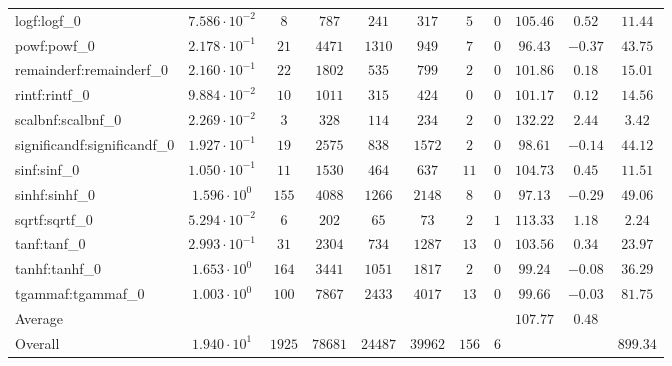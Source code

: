 \begin{tabular}{|l|c|c|c|c|c|c|c|c|c|c|}
logf:logf\_0                 & $ 7.586 \cdot 10^{-2} $ & $ 8      $ & $ 787   $ & $ 241   $ & $ 317   $ & $ 5   $ & $ 0 $ & $ 105.46      $ & $ 0.52    $ & $ 11.44   $ \\
powf:powf\_0                 & $ 2.178 \cdot 10^{-1} $ & $ 21     $ & $ 4471  $ & $ 1310  $ & $ 949   $ & $ 7   $ & $ 0 $ & $ 96.43       $ & $ -0.37   $ & $ 43.75   $ \\
remainderf:remainderf\_0     & $ 2.160 \cdot 10^{-1} $ & $ 22     $ & $ 1802  $ & $ 535   $ & $ 799   $ & $ 2   $ & $ 0 $ & $ 101.86      $ & $ 0.18    $ & $ 15.01   $ \\
rintf:rintf\_0               & $ 9.884 \cdot 10^{-2} $ & $ 10     $ & $ 1011  $ & $ 315   $ & $ 424   $ & $ 0   $ & $ 0 $ & $ 101.17      $ & $ 0.12    $ & $ 14.56   $ \\
scalbnf:scalbnf\_0           & $ 2.269 \cdot 10^{-2} $ & $ 3      $ & $ 328   $ & $ 114   $ & $ 234   $ & $ 2   $ & $ 0 $ & $ 132.22      $ & $ 2.44    $ & $ 3.42    $ \\
significandf:significandf\_0 & $ 1.927 \cdot 10^{-1} $ & $ 19     $ & $ 2575  $ & $ 838   $ & $ 1572  $ & $ 2   $ & $ 0 $ & $ 98.61       $ & $ -0.14   $ & $ 44.12   $ \\
sinf:sinf\_0                 & $ 1.050 \cdot 10^{-1} $ & $ 11     $ & $ 1530  $ & $ 464   $ & $ 637   $ & $ 11  $ & $ 0 $ & $ 104.73      $ & $ 0.45    $ & $ 11.51   $ \\
sinhf:sinhf\_0               & $ 1.596 \cdot 10^{0}  $ & $ 155    $ & $ 4088  $ & $ 1266  $ & $ 2148  $ & $ 8   $ & $ 0 $ & $ 97.13       $ & $ -0.29   $ & $ 49.06   $ \\
sqrtf:sqrtf\_0               & $ 5.294 \cdot 10^{-2} $ & $ 6      $ & $ 202   $ & $ 65    $ & $ 73    $ & $ 2   $ & $ 1 $ & $ 113.33      $ & $ 1.18    $ & $ 2.24    $ \\
tanf:tanf\_0                 & $ 2.993 \cdot 10^{-1} $ & $ 31     $ & $ 2304  $ & $ 734   $ & $ 1287  $ & $ 13  $ & $ 0 $ & $ 103.56      $ & $ 0.34    $ & $ 23.97   $ \\
tanhf:tanhf\_0               & $ 1.653 \cdot 10^{0}  $ & $ 164    $ & $ 3441  $ & $ 1051  $ & $ 1817  $ & $ 2   $ & $ 0 $ & $ 99.24       $ & $ -0.08   $ & $ 36.29   $ \\
tgammaf:tgammaf\_0           & $ 1.003 \cdot 10^{0}  $ & $ 100    $ & $ 7867  $ & $ 2433  $ & $ 4017  $ & $ 13  $ & $ 0 $ & $ 99.66       $ & $ -0.03   $ & $ 81.75   $ \\
\hline
Average                      & $                     $ & $        $ & $       $ & $       $ & $       $ & $     $ & $   $ & $ 107.77      $ & $ 0.48    $ & $         $ \\
\hline
Overall                      & $ 1.940 \cdot 10^{1}  $ & $ 1925   $ & $ 78681 $ & $ 24487 $ & $ 39962 $ & $ 156 $ & $ 6 $ & $             $ & $         $ & $ 899.34  $ \\
\hline
\end{tabular}
